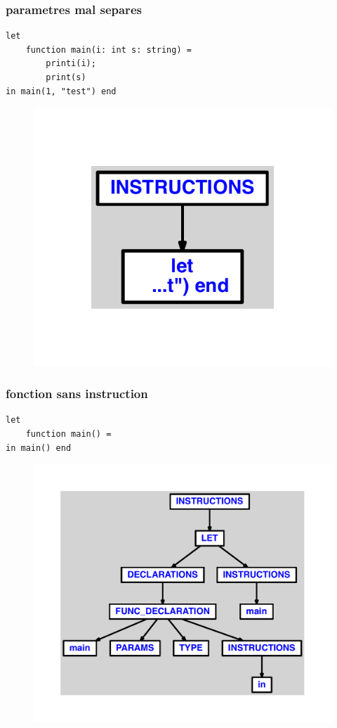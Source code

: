 \documentclass{article}
\begin{document}
\subsubsection{parametres mal separes}
\begin{lstlisting}
let
	function main(i: int s: string) =
		printi(i);
		print(s)
in main(1, "test") end
\end{lstlisting}
\newpage
\begin{figure}[H]
\centering
\includegraphics[max width=\textwidth]{ast/ast_224.pdf}
\end{figure}
\newpage
\subsubsection{fonction sans instruction}
\begin{lstlisting}
let
	function main() =
in main() end
\end{lstlisting}
\newpage
\begin{figure}[H]
\centering
\includegraphics[max width=\textwidth]{ast/ast_225.pdf}
\end{figure}
\newpage
\end{document}
